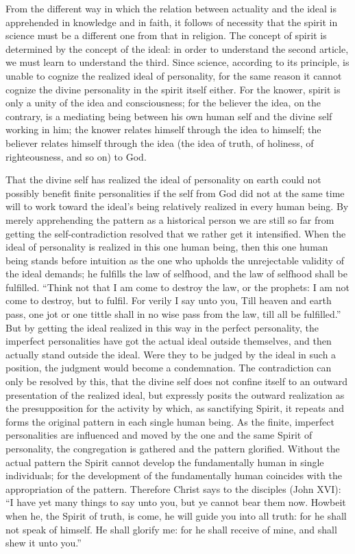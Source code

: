 \documentclass[12pt]{book}
\newcommand{\opage}[1]{\marginnote{\footnotesize\textit{[#1]}}}
\begin{document}
From the different way in which the relation between actuality and the
ideal is apprehended in knowledge and in faith, it follows of necessity
that the spirit in science must be a different one from that in
religion. The concept of spirit is determined by the concept of the
ideal: in order to understand the second
\opage{152}\setcounter{footnote}{0}%
article, we must learn to understand the third. Since science,
according to its principle, is unable to cognize the realized ideal of
personality, for the same reason it cannot cognize the divine
personality in the spirit itself either. For the knower, spirit is only
a unity of the idea and consciousness; for the believer
the idea, on the contrary, is a mediating being between his own human
self and the divine self working in him; the knower relates himself
through the idea to himself; the believer relates himself through the
idea (the idea of truth, of holiness, of righteousness, and so on) to
God.

That the divine self has realized the ideal of personality on earth
could not possibly benefit finite personalities if the self from God did
not at the same time will to work toward the ideal's being relatively
realized in every human being. By merely apprehending the pattern as a
historical person we are still so far from getting the
self-contradiction resolved that we rather get it intensified. When the
ideal of personality is realized in this one human being, then this one
human being stands before intuition as the one who upholds the
unrejectable validity of the ideal demands; he fulfills the law of
selfhood, and the law of selfhood shall be fulfilled. ``Think not that
I am come to destroy the law, or the prophets: I am not come to
destroy, but to fulfil. For verily I say unto you, Till heaven and earth
pass, one jot or one tittle shall in no wise pass from the law, till all
be fulfilled.'' But by getting the ideal realized in this way in the
perfect personality, the imperfect personalities have got the actual
ideal outside themselves, and then actually stand outside the ideal.
Were they to be judged by the ideal in such a position, the judgment
would become a condemnation. The contradiction can only be resolved by
this, that the divine
\opage{153}\setcounter{footnote}{0}%
self does not confine itself to an outward presentation of the realized
ideal, but expressly posits the outward realization as the
presupposition for the activity by which, as sanctifying Spirit, it
repeats and forms the original pattern in each single human being. As
the finite, imperfect personalities are influenced and moved by the one
and the same Spirit of personality, the congregation is gathered and the
pattern glorified. Without the actual pattern the Spirit cannot develop
the fundamentally human in single individuals; for the development of
the fundamentally human coincides with the appropriation of the pattern.
Therefore Christ says to the disciples (John XVI): ``I have yet many
things to say unto you, but ye cannot bear them now. Howbeit when he,
the Spirit of truth, is come, he will guide you into all truth: for he
shall not speak of himself. He shall glorify me: for he shall receive of
mine, and shall shew it unto you.''
\end{document}

